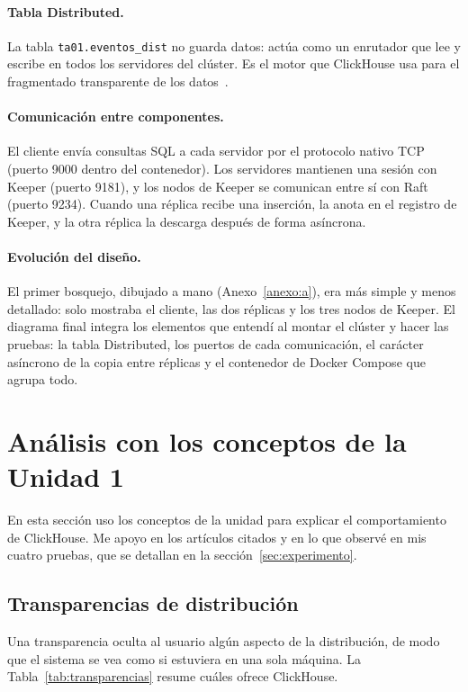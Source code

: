 \documentclass[12pt,a4paper]{article}
\begin{document}
\paragraph{Tabla Distributed.} La tabla \texttt{ta01.eventos\_dist} no
guarda datos: actúa como un enrutador que lee y escribe en todos los
servidores del clúster. Es el motor que ClickHouse usa para el
fragmentado transparente de los datos~\cite[p.~3732]{schulze2024}.

\paragraph{Comunicación entre componentes.} El cliente envía consultas
SQL a cada servidor por el protocolo nativo TCP (puerto 9000 dentro del
contenedor). Los servidores mantienen una sesión con Keeper (puerto
9181), y los nodos de Keeper se comunican entre sí con Raft (puerto
9234). Cuando una réplica recibe una inserción, la anota en el registro
de Keeper, y la otra réplica la descarga después de forma asíncrona.

\paragraph{Evolución del diseño.} El primer bosquejo, dibujado a mano
(Anexo~\ref{anexo:a}), era más simple y menos detallado: solo mostraba
el cliente, las dos réplicas y los tres nodos de Keeper. El diagrama
final integra los elementos que entendí al montar el clúster y hacer las
pruebas: la tabla Distributed, los puertos de cada comunicación, el
carácter asíncrono de la copia entre réplicas y el contenedor de Docker
Compose que agrupa todo.

\section{Análisis con los conceptos de la Unidad 1}

En esta sección uso los conceptos de la unidad para explicar el
comportamiento de ClickHouse. Me apoyo en los artículos citados y en lo
que observé en mis cuatro pruebas, que se detallan en la
sección~\ref{sec:experimento}.

\subsection{Transparencias de distribución}

Una transparencia oculta al usuario algún aspecto de la distribución,
de modo que el sistema se vea como si estuviera en una sola máquina. La
Tabla~\ref{tab:transparencias} resume cuáles ofrece ClickHouse.
\end{document}
